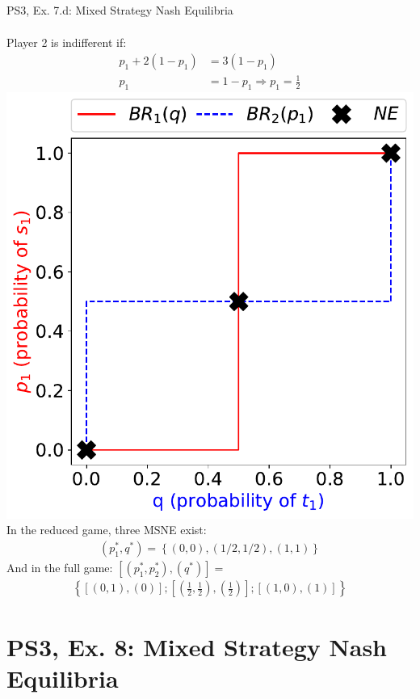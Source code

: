 \begin{frame}{PS3, Ex. 7.d: Mixed Strategy Nash Equilibria}
\begin{multicols}{2}
\begin{align*}
    \end{align*}
    Player 2 is indifferent if:
    \vspace{-4pt}
    \begin{align*}
      p_1 + 2(1-p_1)  &= 3(1-p_1) \\
      p_1             &= 1-p_1 \Rightarrow p_1 = \frac{1}{2}
    \end{align*}
  \vfill\null \columnbreak
    \includegraphics[width=\columnwidth]{figures/5d2}
    In the reduced game, three MSNE exist:
    \begin{align*}
      (p_1^{*},q^{*})=\left\{(0,0),(1/2,1/2),(1,1)\right\}
    \end{align*}
    And in the full game: $\left[(p_1^{*},p_2^{*}),(q^{*})\right]=$
    \begin{align*}
      \left\{\left[(0,1),(0)\right];\left[\left(\frac{1}{2},\frac{1}{2}\right),\left(\frac{1}{2}\right)\right];\left[(1,0),(1)\right]\right\}
    \end{align*}
  \vfill\null
  \end{multicols}
\end{frame}


\section{PS3, Ex. 8: Mixed Strategy Nash Equilibria}

